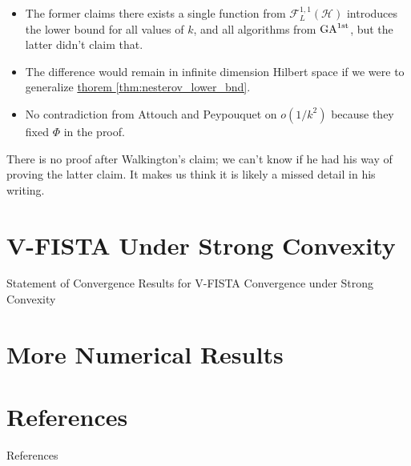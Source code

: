 \documentclass[11pt]{beamer}
\theoremstyle{definition}
\begin{document}
    \begin{frame}
        \begin{itemize}
            \item The former claims there exists a single function from $\mathcal F_{L}^{1,1}(\mathcal H)$ introduces the lower bound for all values of $k$, and all algorithms from $\text{GA}^{\text{1st}}$, but the latter didn't claim that. 
            \item The difference would remain in infinite dimension Hilbert space if we were to generalize \hyperref[thm:nesterov_lower_bnd]{thorem \ref*{thm:nesterov_lower_bnd}}.
            \item No contradiction from Attouch and Peypouquet\cite{attouch_rate_2016} on $o(1/k^2)$ because they fixed $\Phi$ in the proof. 
        \end{itemize}
        There is no proof after Walkington's claim; we can't know if he had his way of proving the latter claim. 
        It makes us think it is likely a missed detail in his writing. 
    \end{frame}
 

\section{V-FISTA Under Strong Convexity}
    \begin{frame}{Statement of Convergence Results for V-FISTA Convergence under Strong Convexity}
        
    \end{frame}

\section{More Numerical Results}

    
\section{References}
    \begin{frame}[allowframebreaks]{References}
        
        
    \end{frame}
\end{document}

